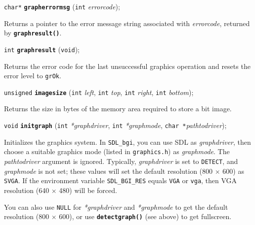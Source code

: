\documentclass[a4paper,12pt]{article}
\newcommand{\SDLbgi}{\texttt{SDL\_bgi}}
\newcommand{\V}{\texttt{void}}      %
\newcommand{\I}{\texttt{int}}       %
\newcommand{\C}{\texttt{char *}}    %
\newcommand{\func}[1]{\textbf{\texttt{#1}}}  %
\newcommand{\A}[1]{\emph{#1}}       %
\newcommand{\F}[1]{\texttt{#1}}     %
\newcommand{\T}[1]{\texttt{#1}}     %
\newenvironment{bgi}
{ %
  \begin{snugshade}
}
{ %
  \end{snugshade}
}
\begin{document}

\label{sec:grapherrormsg}

\begin{bgi}
\texttt{char*} \func{grapherrormsg} (\I{} \A{errorcode});
\end{bgi}

Returns a pointer to the error message string associated with
\A{errorcode}, returned by \func{graphresult()}.


\label{sec:graphresult}

\begin{bgi}
\I{} \func{graphresult} (\V{});
\end{bgi}

Returns the error code for the last unsuccessful graphics operation
and resets the error level to \texttt{grOk}.


\label{sec:imagesize}

\begin{bgi}
\texttt{unsigned} \func{imagesize} (\I{} \A{left}, \I{} \A{top}, \I{}
\A{right}, \I{} \A{bottom});
\end{bgi}

Returns the size in bytes of the memory area required to store a bit
image.


\label{sec:initgraph}

\begin{bgi}
\V{} \func{initgraph} (\I{} \A{*graphdriver}, \I{} \A{*graphmode},
\C{}\A{pathtodriver});
\end{bgi}

Initializes the graphics system. In \SDLbgi, you can use SDL as
\A{graphdriver}, then choose a suitable graphics mode (listed in
\F{graphics.h}) as \A{graphmode}. The \A{pathtodriver} argument is
ignored. Typically, \A{graphdriver} is set to \T{DETECT}, and
\A{graphmode} is not set; these values will set the default resolution
(800 $\times$ 600) as \T{SVGA}. If the environment variable
\T{SDL\_BGI\_RES} equals \T{VGA} or \T{vga}, then VGA resolution (640
$\times$ 480) will be forced.

You can also use \T{NULL} for \A{*graphdriver} and \A{*graphmode} to
get the default resolution (800 $\times$ 600), or use
\func{detectgraph()} (see above) to get fullscreen.
\end{document}
